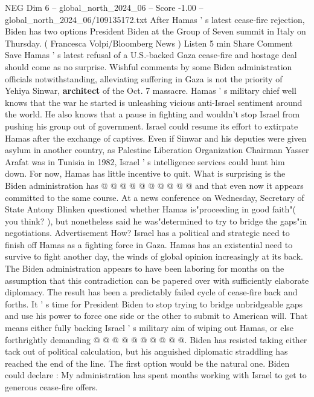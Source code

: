 \begin{textsample}{NEG Dim 6 – global\_north\_2024\_06 – Score -1.00 – global\_north\_2024\_06/109135172.txt}  \label{ex:f6_neg_307}
After Hamas ' s latest cease-fire rejection, Biden has two options President Biden at the Group of Seven summit in Italy on Thursday. ( Francesca Volpi/Bloomberg News ) Listen 5 min Share Comment Save Hamas ' s latest refusal of a U.S.-backed Gaza cease-fire and hostage deal should come as no surprise.
Wishful comments by some Biden administration officials notwithstanding, alleviating suffering in Gaza is not the priority of Yehiya Sinwar, \textbf{architect} of the Oct. 7 massacre.
Hamas ' s military chief well knows that the war he started is unleashing vicious anti-Israel sentiment around the world.
He also knows that a pause in fighting and wouldn't stop Israel from pushing his group out of government.
Israel could resume its effort to extirpate Hamas after the exchange of captives.
Even if Sinwar and his deputies were given asylum in another country, as Palestine Liberation Organization Chairman Yasser Arafat was in Tunisia in 1982, Israel ' s intelligence services could hunt him down.
For now, Hamas has little incentive to quit.
What is surprising is the Biden administration has @ @ @ @ @ @ @ @ @ @ and that even now it appears committed to the same course.
At a news conference on Wednesday, Secretary of State Antony Blinken questioned whether Hamas is"proceeding in good faith"( you think? ), but nonetheless said he was"determined to try to bridge the gaps"in negotiations.
Advertisement How?
Israel has a political and strategic need to finish off Hamas as a fighting force in Gaza.
Hamas has an existential need to survive to fight another day, the winds of global opinion increasingly at its back.
The Biden administration appears to have been laboring for months on the assumption that this contradiction can be papered over with sufficiently elaborate diplomacy.
The result has been a predictably failed cycle of cease-fire back and forths.
It ' s time for President Biden to stop trying to bridge unbridgeable gaps and use his power to force one side or the other to submit to American will.
That means either fully backing Israel ' s military aim of wiping out Hamas, or else forthrightly demanding @ @ @ @ @ @ @ @ @ @.
Biden has resisted taking either tack out of political calculation, but his anguished diplomatic straddling has reached the end of the line.
The first option would be the natural one.
Biden could declare : My administration has spent months working with Israel to get to generous cease-fire offers.

\end{textsample}
